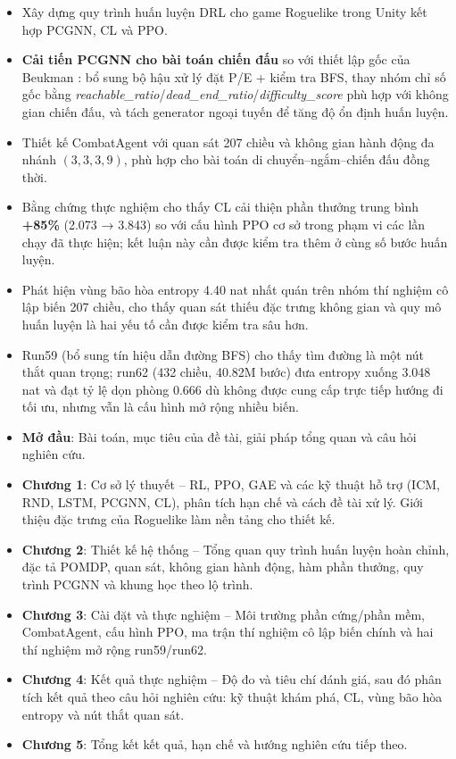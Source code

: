\renewcommand{\labelitemi}{$-$}
\begin{itemize}
    \item Xây dựng quy trình huấn luyện DRL cho game Roguelike trong Unity kết hợp PCGNN, CL và PPO.
    \item \textbf{Cải tiến PCGNN cho bài toán chiến đấu} so với thiết lập gốc của Beukman \cite{Beukman2022}: bổ sung bộ hậu xử lý đặt P/E + kiểm tra BFS, thay nhóm chỉ số gốc bằng \emph{reachable\_ratio}/\emph{dead\_end\_ratio}/\emph{difficulty\_score} phù hợp với không gian chiến đấu, và tách generator ngoại tuyến để tăng độ ổn định huấn luyện.
    \item Thiết kế CombatAgent với quan sát 207 chiều và không gian hành động đa nhánh $(3,3,3,9)$, phù hợp cho bài toán di chuyển--ngắm--chiến đấu đồng thời.
    \item Bằng chứng thực nghiệm cho thấy CL cải thiện phần thưởng trung bình \textbf{+85\%} (2.073 → 3.843) so với cấu hình PPO cơ sở trong phạm vi các lần chạy đã thực hiện; kết luận này cần được kiểm tra thêm ở cùng số bước huấn luyện.
    \item Phát hiện vùng bão hòa entropy 4.40 nat nhất quán trên nhóm thí nghiệm cô lập biến 207 chiều, cho thấy quan sát thiếu đặc trưng không gian và quy mô huấn luyện là hai yếu tố cần được kiểm tra sâu hơn.
    \item Run59 (bổ sung tín hiệu dẫn đường BFS) cho thấy tìm đường là một nút thắt quan trọng; run62 (432 chiều, 40.82M bước) đưa entropy xuống 3.048 nat và đạt tỷ lệ dọn phòng 0.666 dù không được cung cấp trực tiếp hướng đi tối ưu, nhưng vẫn là cấu hình mở rộng nhiều biến.
\end{itemize}

\vspace{0.3cm}


\renewcommand{\labelitemi}{$-$}
\begin{itemize}
	\item \textbf{Mở đầu}: Bài toán, mục tiêu của đề tài, giải pháp tổng quan và câu hỏi nghiên cứu.
	\item \textbf{Chương 1}: Cơ sở lý thuyết -- RL, PPO, GAE và các kỹ thuật hỗ trợ (ICM, RND, LSTM, PCGNN, CL), phân tích hạn chế và cách đề tài xử lý. Giới thiệu đặc trưng của Roguelike làm nền tảng cho thiết kế.
	\item \textbf{Chương 2}: Thiết kế hệ thống -- Tổng quan quy trình huấn luyện hoàn chỉnh, đặc tả POMDP, quan sát, không gian hành động, hàm phần thưởng, quy trình PCGNN và khung học theo lộ trình.
	\item \textbf{Chương 3}: Cài đặt và thực nghiệm -- Môi trường phần cứng/phần mềm, CombatAgent, cấu hình PPO, ma trận thí nghiệm cô lập biến chính và hai thí nghiệm mở rộng run59/run62.
	\item \textbf{Chương 4}: Kết quả thực nghiệm -- Độ đo và tiêu chí đánh giá, sau đó phân tích kết quả theo câu hỏi nghiên cứu: kỹ thuật khám phá, CL, vùng bão hòa entropy và nút thắt quan sát.
	\item \textbf{Chương 5}: Tổng kết kết quả, hạn chế và hướng nghiên cứu tiếp theo.
\end{itemize}
